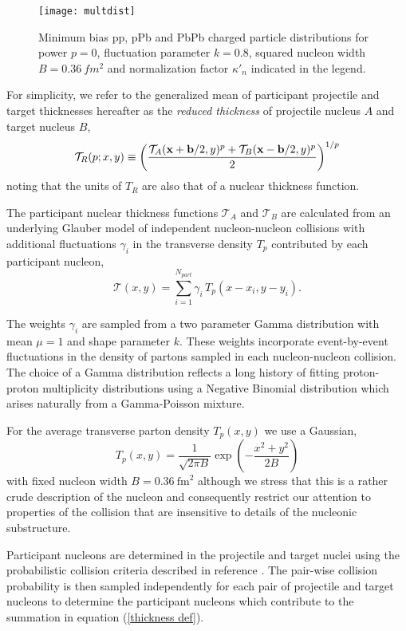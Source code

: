 \documentclass[aps,prl,reprint,amsmath,nofootinbib]{revtex4-1}
\begin{document}
\begin{figure*}[t]
    \texttt{[image: multdist]}
    \caption{\label{fig:multdist} Minimum bias pp, pPb and PbPb charged particle distributions for power $p=0$, fluctuation parameter $k=0.8$, squared nucleon width 
    $B=0.36~fm^2$ and normalization factor $\kappa'_n$ indicated in the legend.}
\end{figure*}

For simplicity, we refer to the generalized mean of participant projectile and target thicknesses hereafter as the \emph{reduced thickness} of projectile 
nucleus $A$ and target nucleus $B$,
\begin{equation}
 \label{reduced}
 \mathcal{T}_R(p;x,y) \equiv \left( \frac{\mathcal{T}_A({\bf x}+{\bf b}/2,y)^p + \mathcal{T}_B({\bf x}-{\bf b}/2,y)^p}{2} \right)^{1/p}
\end{equation}
noting that the units of $T_R$ are also that of a nuclear thickness function. 

The participant nuclear thickness functions $\mathcal{T}_A$ and $\mathcal{T}_B$ are calculated from an underlying Glauber model of independent nucleon-nucleon 
collisions with additional fluctuations $\gamma_i$ in the transverse density $T_p$ contributed by each participant nucleon,
\begin{equation}
 \label{thickness def}
 \mathcal{T}(x,y) = \sum\limits_{i=1}^{N_{part}} \gamma_i\, T_p(x-x_i,y-y_i).
\end{equation}

The weights $\gamma_i$ are sampled from a two parameter Gamma distribution with mean $\mu=1$ and shape parameter $k$. These weights incorporate event-by-event 
fluctuations in the density of partons sampled in each nucleon-nucleon collision. The choice of a Gamma distribution reflects a long history of fitting proton-proton 
multiplicity distributions using a Negative Binomial distribution which arises naturally from a Gamma-Poisson mixture.

For the average transverse parton density $T_p(x,y)$ we use a Gaussian,
\begin{equation}
 T_p(x,y) = \frac{1}{\sqrt{2 \pi B}} \exp\left(-\frac{x^2+y^2}{2 B}\right) 
\end{equation}
with fixed nucleon width $B=0.36 ~\mathrm{fm}^2$ although we stress that this is a rather crude description of the nucleon and consequently restrict our attention 
to properties of the collision that are insensitive to details of the nucleonic substructure.

Participant nucleons are determined in the projectile and target nuclei using the probabilistic collision criteria described in reference \cite{proton-proton}. 
The pair-wise collision probability is then sampled independently for each pair of projectile and target nucleons to determine the 
participant nucleons which contribute to the summation in equation (\ref{thickness def}).
\end{document}
